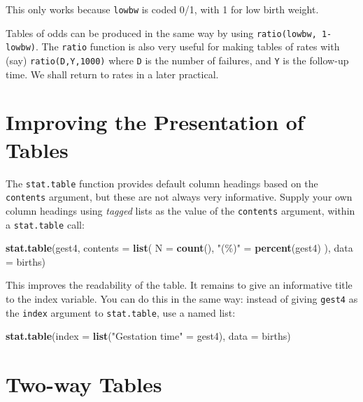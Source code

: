 \documentclass[
]{book}
\newenvironment{Shaded}{\begin{snugshade}}{\end{snugshade}}
\newcommand{\AttributeTok}[1]{\textcolor[rgb]{0.13,0.29,0.53}{#1}}
\newcommand{\FunctionTok}[1]{\textcolor[rgb]{0.13,0.29,0.53}{\textbf{#1}}}
\newcommand{\NormalTok}[1]{#1}
\newcommand{\OtherTok}[1]{\textcolor[rgb]{0.56,0.35,0.01}{#1}}
\newcommand{\StringTok}[1]{\textcolor[rgb]{0.31,0.60,0.02}{#1}}
\begin{document}
This only works because \texttt{lowbw} is coded 0/1, with 1 for low birth
weight.

Tables of odds can be produced in the same way by using
\texttt{ratio(lowbw,\ 1-lowbw)}. The \texttt{ratio} function is also very useful
for making tables of rates with (say) \texttt{ratio(D,Y,1000)} where
\texttt{D} is the number of failures, and \texttt{Y} is the follow-up time. We
shall return to rates in a later practical.

\section{Improving the Presentation of Tables}\label{improving-the-presentation-of-tables}

The \texttt{stat.table} function provides default column headings based
on the \texttt{contents} argument, but these are not always very informative.
Supply your own column headings using \emph{tagged} lists as the
value of the \texttt{contents} argument, within a \texttt{stat.table} call:

\begin{Shaded}
\begin{Highlighting}[]
\FunctionTok{stat.table}\NormalTok{(gest4, }\AttributeTok{contents =} \FunctionTok{list}\NormalTok{(}
  \AttributeTok{N =} \FunctionTok{count}\NormalTok{(),}
  \StringTok{"(\%)"} \OtherTok{=} \FunctionTok{percent}\NormalTok{(gest4)}
\NormalTok{), }\AttributeTok{data =}\NormalTok{ births)}
\end{Highlighting}
\end{Shaded}

This improves the readability of the table. It remains to give an
informative title to the index variable. You can do this in the same way:
instead of giving \texttt{gest4} as the \texttt{index} argument to \texttt{stat.table},
use a named list:

\begin{Shaded}
\begin{Highlighting}[]
\FunctionTok{stat.table}\NormalTok{(}\AttributeTok{index =} \FunctionTok{list}\NormalTok{(}\StringTok{"Gestation time"} \OtherTok{=}\NormalTok{ gest4), }\AttributeTok{data =}\NormalTok{ births)}
\end{Highlighting}
\end{Shaded}

\section{Two-way Tables}\label{two-way-tables}
\end{document}
